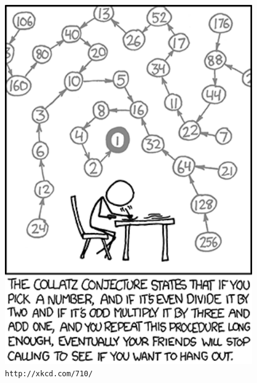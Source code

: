 \begin{minipage}[t]{0.4\textwidth}
\vspace{0pt}
\begin{center}
\includegraphics[width=0.8\textwidth]{collatz.png} \\
\tt{http://xkcd.com/710/}
\end{center}


\end{minipage}

